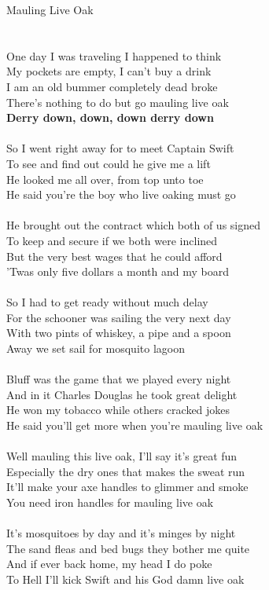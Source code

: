 \documentclass[letterpaper,9pt]{article}
\begin{document}
\newpage
{}
\huge
Mauling Live Oak\\
\\
\Large
\noindent
\\One day I was traveling I happened to think
\\My pockets are empty, I can't buy a drink
\\I am an old bummer completely dead broke
\\There's nothing to do but go mauling live oak
\\\textbf{Derry down, down, down derry down}
\\
\\So I went right away for to meet Captain Swift
\\To see and find out could he give me a lift
\\He looked me all over, from top unto toe
\\He said you're the boy who live oaking must go
\\
\\He brought out the contract which both of us signed
\\To keep and secure if we both were inclined
\\But the very best wages that he could afford
\\'Twas only five dollars a month and my board
\\
\\So I had to get ready without much delay
\\For the schooner was sailing the very next day
\\With two pints of whiskey, a pipe and a spoon
\\Away we set sail for mosquito lagoon
\\
\\Bluff was the game that we played every night
\\And in it Charles Douglas he took great delight
\\He won my tobacco while others cracked jokes
\\He said you'll get more when you're mauling live oak
\\
\\Well mauling this live oak, I'll say it's great fun
\\Especially the dry ones that makes the sweat run
\\It'll make your axe handles to glimmer and smoke
\\You need iron handles for mauling live oak
\\
\\It's mosquitoes by day and it's minges by night
\\The sand fleas and bed bugs they bother me quite
\\And if ever back home, my head I do poke
\\To Hell I'll kick Swift and his God damn live oak
\end{document}
